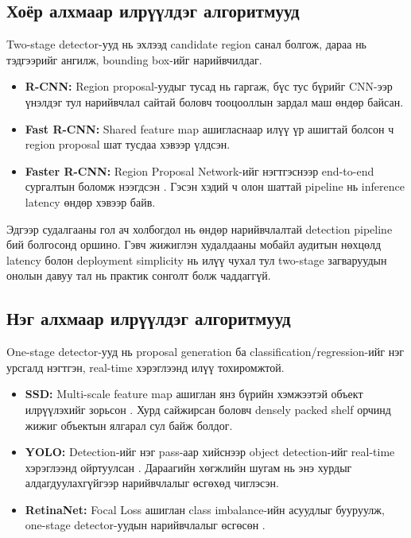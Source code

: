 \subsection{Хоёр алхмаар илрүүлдэг алгоритмууд}
Two-stage detector-ууд нь эхлээд candidate region санал болгож, дараа нь тэдгээрийг ангилж, bounding box-ийг нарийвчилдаг.

\begin{itemize}
\item \textbf{R-CNN:} Region proposal-уудыг тусад нь гаргаж, бүс тус бүрийг CNN-ээр үнэлдэг тул нарийвчлал сайтай боловч тооцооллын зардал маш өндөр байсан.
\item \textbf{Fast R-CNN:} Shared feature map ашигласнаар илүү үр ашигтай болсон ч region proposal шат тусдаа хэвээр үлдсэн.
\item \textbf{Faster R-CNN:} Region Proposal Network-ийг нэгтгэснээр end-to-end сургалтын боломж нээгдсэн \cite{faster_rcnn}. Гэсэн хэдий ч олон шаттай pipeline нь inference latency өндөр хэвээр байв.
\end{itemize}

Эдгээр судалгааны гол ач холбогдол нь өндөр нарийвчлалтай detection pipeline бий болгосонд оршино. Гэвч жижиглэн худалдааны мобайл аудитын нөхцөлд latency болон deployment simplicity нь илүү чухал тул two-stage загваруудын онолын давуу тал нь практик сонголт болж чаддаггүй.

\subsection{Нэг алхмаар илрүүлдэг алгоритмууд}
One-stage detector-ууд нь proposal generation ба classification/regression-ийг нэг урсгалд нэгтгэн, real-time хэрэглээнд илүү тохиромжтой.

\begin{itemize}
\item \textbf{SSD:} Multi-scale feature map ашиглан янз бүрийн хэмжээтэй объект илрүүлэхийг зорьсон \cite{ssd,fpn}. Хурд сайжирсан боловч densely packed shelf орчинд жижиг объектын ялгарал сул байж болдог.
\item \textbf{YOLO:} Detection-ийг нэг pass-аар хийснээр object detection-ийг real-time хэрэглээнд ойртуулсан \cite{yolo_original}. Дараагийн хөгжлийн шугам нь энэ хурдыг алдагдуулахгүйгээр нарийвчлалыг өсгөхөд чиглэсэн.
\item \textbf{RetinaNet:} Focal Loss ашиглан class imbalance-ийн асуудлыг бууруулж, one-stage detector-уудын нарийвчлалыг өсгөсөн \cite{focal_loss}.
\end{itemize}

